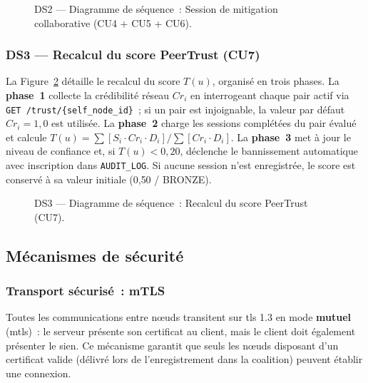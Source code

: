 \begin{figure}[H]
\centering
{}
\caption{DS2 — Diagramme de séquence~: Session de mitigation collaborative (CU4 + CU5 + CU6).}
\label{fig:seq_mitigation}
\end{figure}
\clearpage

\subsubsection{DS3 — Recalcul du score PeerTrust (CU7)}

La Figure~\ref{fig:seq_peertrust} détaille le recalcul du score $T(u)$, organisé en trois phases. La \textbf{phase~1} collecte la crédibilité réseau $Cr_i$ en interrogeant chaque pair actif via \texttt{GET /trust/\{self\_node\_id\}}~; si un pair est injoignable, la valeur par défaut $Cr_i = 1{,}0$ est utilisée. La \textbf{phase~2} charge les sessions complétées du pair évalué et calcule $T(u) = \sum[S_i \cdot Cr_i \cdot D_i] / \sum[Cr_i \cdot D_i]$. La \textbf{phase~3} met à jour le niveau de confiance et, si $T(u) < 0{,}20$, déclenche le bannissement automatique avec inscription dans \texttt{AUDIT\_LOG}. Si aucune session n'est enregistrée, le score est conservé à sa valeur initiale (0{,}50 / BRONZE).

\begin{figure}[H]
\centering
{}
\caption{DS3 — Diagramme de séquence~: Recalcul du score PeerTrust (CU7).}
\label{fig:seq_peertrust}
\end{figure}
\clearpage

\subsection{Mécanismes de sécurité}
\label{sec:securite}

\subsubsection{Transport sécurisé~: mTLS}

Toutes les communications entre nœuds transitent sur \gls{tls} 1.3 \parencite{rfc8446tls13} en mode \textbf{mutuel} (\gls{mtls})~: le serveur présente son certificat au client, mais le client doit également présenter le sien. Ce mécanisme garantit que seuls les nœuds disposant d'un certificat valide (délivré lors de l'enregistrement dans la coalition) peuvent établir une connexion.

